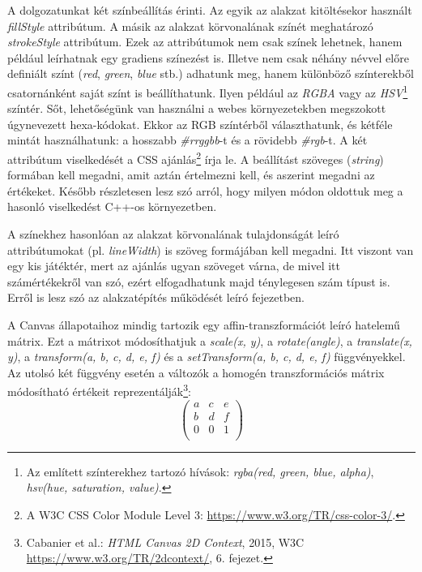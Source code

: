 \documentclass[12pt]{report}
\theoremstyle{definition}
\newcommand{\func}[1]{{\textsl{#1}}}
\begin{document}
A dolgozatunkat két színbeállítás érinti. Az egyik az alakzat kitöltésekor
használt \func{fillStyle} attribútum. A másik az alakzat körvonalának színét
meghatározó \func{strokeStyle} attribútum. Ezek az attribútumok nem csak színek
lehetnek, hanem például leírhatnak egy gradiens színezést is. Illetve nem csak
néhány névvel előre definiált színt (\func{red}, \func{green}, \func{blue}
stb.) adhatunk meg, hanem különböző színterekből csatornánként saját színt is
beállíthatunk. Ilyen például az \emph{RGBA} vagy az \emph{HSV}\footnote{Az
említett színterekhez tartozó hívások: \func{rgba(red, green, blue, alpha)},
\func{hsv(hue, saturation, value)}.} színtér. Sőt, lehetőségünk van használni a
webes környezetekben megszokott úgynevezett hexa-kódokat. Ekkor az RGB
színtérből választhatunk, és kétféle mintát használhatunk: a hosszabb
\func{\#rrggbb}-t és a rövidebb \func{\#rgb}-t. A két attribútum viselkedését a
CSS ajánlás\footnote {A W3C CSS Color Module Level 3:\footnotesize{
\url{https://www.w3.org/TR/css-color-3/}}.} írja le. A beállítást szöveges
(\func{string}) formában kell megadni, amit aztán értelmezni kell, és aszerint
megadni az értékeket. Később részletesen lesz szó arról, hogy milyen módon
oldottuk meg a hasonló viselkedést C++-os környezetben.

A színekhez hasonlóan az alakzat körvonalának tulajdonságát leíró
attribútumokat (pl. \func{lineWidth}) is szöveg formájában kell megadni. Itt
viszont van egy kis játéktér, mert az ajánlás ugyan szöveget várna, de mivel
itt számértékekről van szó, ezért elfogadhatunk majd ténylegesen szám típust
is. Erről is lesz szó az alakzatépítés működését leíró fejezetben.

A Canvas állapotaihoz mindig tartozik egy affin-transzformációt leíró hatelemű
mátrix. Ezt a mátrixot módosíthatjuk a \func{scale(x, y)}, a
\func{rotate(angle)}, a \func{translate(x, y)},  a \func{transform(a, b, c, d,
e, f)} és a \func{setTransform(a, b, c, d, e, f)} függvényekkel. Az utolsó két
függvény esetén a változók a homogén transzformációs mátrix módosítható
értékeit reprezentálják\footnote{Cabanier et al.: \emph{{HTML} Canvas {2D}
Context}, 2015, W3C\\ \footnotesize{ \url{https://www.w3.org/TR/2dcontext/}},
6. fejezet.}: \[\begin{pmatrix}a & c & e \\ b & d & f \\ 0 & 0 & 1 \\
\end{pmatrix}\]
\end{document}
